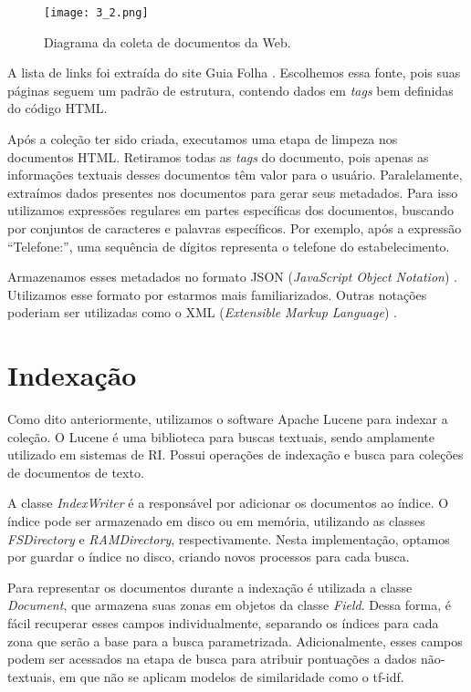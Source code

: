 \begin{figure}[!h]
  \centering
  \texttt{[image: 3\_2.png]} 
  \caption{Diagrama da coleta de documentos da Web.}
  \label{fig:diagcol} 
\end{figure}

A lista de links foi extraída do site Guia Folha \cite{GuiaFolha}. Escolhemos essa fonte, pois suas páginas seguem um padrão de estrutura, contendo dados em \emph{tags} bem definidas do código HTML. 

Após a coleção ter sido criada, executamos uma etapa de limpeza nos documentos HTML. Retiramos todas as \emph{tags} do documento, pois apenas as informações textuais desses documentos têm valor para o usuário. Paralelamente, extraímos dados presentes nos documentos para gerar seus metadados. Para isso utilizamos expressões regulares \cite{ExpRegulares} em partes específicas dos documentos, buscando por conjuntos de caracteres e palavras específicos. Por exemplo, após a expressão ``Telefone:'', uma sequência de dígitos representa o telefone do estabelecimento.

Armazenamos esses metadados no formato JSON (\emph{JavaScript Object Notation}) \cite{JSON}. Utilizamos esse formato por estarmos mais familiarizados. Outras notações poderiam ser utilizadas como o XML (\emph{Extensible Markup Language}) \cite{XML}.

\section{Indexação}
\label{sec:indexacao}

Como dito anteriormente, utilizamos o software Apache Lucene \cite{ApacheLucene} para indexar a coleção. O Lucene é uma biblioteca para buscas textuais, sendo amplamente utilizado em sistemas de RI. Possui operações de indexação e busca para coleções de documentos de texto.

A classe \emph{IndexWriter} \cite{IndexWriter} é a responsável por adicionar os documentos ao índice. O índice pode ser armazenado em disco ou em memória, utilizando as classes \emph{FSDirectory} e \emph{RAMDirectory}, respectivamente. Nesta implementação, optamos por guardar o índice no disco, criando novos processos para cada busca.

Para representar os documentos durante a indexação é utilizada a classe \emph{Document}, que armazena suas zonas em objetos da classe \emph{Field}. Dessa forma, é fácil recuperar esses campos individualmente, separando os índices para cada zona que serão a base para a busca parametrizada. Adicionalmente, esses campos podem ser acessados na etapa de busca para atribuir pontuações a dados não-textuais, em que não se aplicam modelos de similaridade como o tf-idf.

